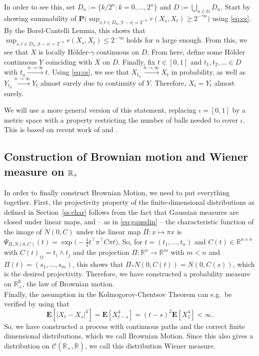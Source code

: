 \documentclass[lean]{AFM}
\begin{document}
In order to see this, set $D_n := \{k/2^n: k=0,...,2^n\}$ and $D := \bigcup_{n\in\mathbb N} D_n$. Start by showing summability of $\mathbf P\Big( \sup_{s,t\in D_n, |t-s| = 2^{-n}} r(X_s, X_t) \geq 2^{-\gamma n} \Big)$ using \eqref{eq:cs}. By the Borel-Cantelli Lemma, this shows that $\sup_{s,t\in D_n, |t-s| = 2^{-n}} r(X_s, X_t) \leq 2^{-\gamma n}$ holds for $n$ large enough. From this, we see that $X$ is locally Hölder-$\gamma$ continuous on $D$. From here, define some Hölder continuous $Y$ coinciding with $X$ on $D$. Finally, fix $t \in [0,1]$ and $t_1, t_2,...\in D$ with $t_n \xrightarrow{n\to\infty} t$. Using \eqref{eq:cs}, we see that $X_{t_n} \xrightarrow{n\to\infty} X_t$ in probability, as well as $Y_{t_n} \xrightarrow{n\to\infty} Y_t$ almost surely due to continuity of $Y$. Therefore, $X_t = Y_t$ almost surely.

We will use a more general version of this statement, replacing $\iota = [0,1]$ by a metric space with a property restricting the number of balls needed to cover $\iota$. This is based on recent work of \cite{talagrand2022upper} and \cite{kratschmer2023kolmogorov}.

\subsection{Construction of Brownian motion and Wiener measure on $\mathbb{R}_+$}
In order to finally construct Brownian Motion, we need to put everything together. First, the projectivity property of the finite-dimensional distributions as defined in Section~\ref{ss:char} follows from the fact that Gaussian measures are closed under linear maps, and -- as in \eqref{eq:gausslin} -- the characteristic function of the image of $N(0,C)$ under the linear map $\Pi : x \mapsto \pi x$ is $\Psi_{\Pi_\ast N(0,C)}(t) = \exp\Big( -\tfrac 12 t^\top \pi^\top C \pi t \Big)$. So, for $t = (t_1,...,t_n)$ and $C(t) \in \mathbb R^{n\times n}$ with $C(t)_{ij} = t_i \wedge t_j$ and the projection $\Pi: \mathbb R^n \to \mathbb R^m$ with $m < n$ and $\Pi(t) = (s_1,...,s_m)$, this shows that $\Pi_\ast N(0,C(t)) = N(0,C(s))$, which is the desired projectivity. Therefore, we have constructed a probability measure on $\mathbb R_+^{\mathbb R}$, the law of Brownian motion.\\
Finally, the assumption in the Kolmogorov-Chentsov Theorem can e.g.\ be verified by using that
\[ \mathbf E[|X_t - X_s|^4] = \mathbf E[X_{t-s}^4] = (t-s)^2 \mathbf E[X_{1}^4] < \infty.\]
So, we have constructed a process with continuous paths and the correct finite dimensional distributions, which we call Brownian Motion. Since this also gives a distribution on $\mathcal C(\mathbb R_+, \mathbb R)$, we call this distribution Wiener measure.
\end{document}
